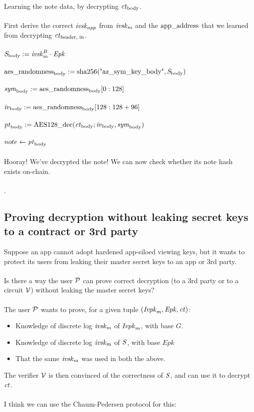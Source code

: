 Learning the note data, by decrypting $\ctbody$.\\
\\
First derive the correct $\ivskapp$ from $\ivskm$ and the $\appaddress$ that we learned from decrypting $\ctheaderin$.\\
\\
$\sharedsecretbody := \ivskm^B \cdot \Epk$\\
\\
$\aesrandomnessbody := \sha(\text{"az\_sym\_key\_body"}, \sharedsecretbody)$\\
\\
$\symkeybody := \aesrandomnessbody[0:128]$\\
\\
$\ivbody := \aesrandomnessbody[128:128 + 96]$\\
\\
$\ptbody := \aesdecrypt(\ctbody; \ivbody, \symkeybody)$\\
\\
$note \leftarrow \ptbody$\\
\\
Hooray! We've decrypted the note! We can now check whether its note hash exists on-chain.\\
\\
.



\subsection{Proving decryption without leaking secret keys to a contract or 3rd party}

Suppose an app cannot adopt hardened app-siloed viewing keys, but it wants to protect its users from leaking their master secret keys to an app or 3rd party.\\
\\
Is there a way the user $\P$ can prove correct decryption (to a 3rd party or to a circuit $\V$) without leaking the master secret keys?\\
\\
The user $\P$ wants to prove, for a given tuple $(\Ivpkm, \Epk, \ct)$:
\begin{itemize}
    \item Knowledge of discrete log $\ivskm$ of $\Ivpkm$, with base $G$.
    \item Knowledge of discrete log $\ivskm$ of $\sharedsecret$, with base $Epk$
    \item That the same $\ivskm$ was used in both the above.
\end{itemize}
\noindent
The verifier $\V$ is then convinced of the correctness of $\sharedsecret$, and can use it to decrypt $\ct$.\\
\\
I think we can use the Chaum-Pedersen protocol for this:

